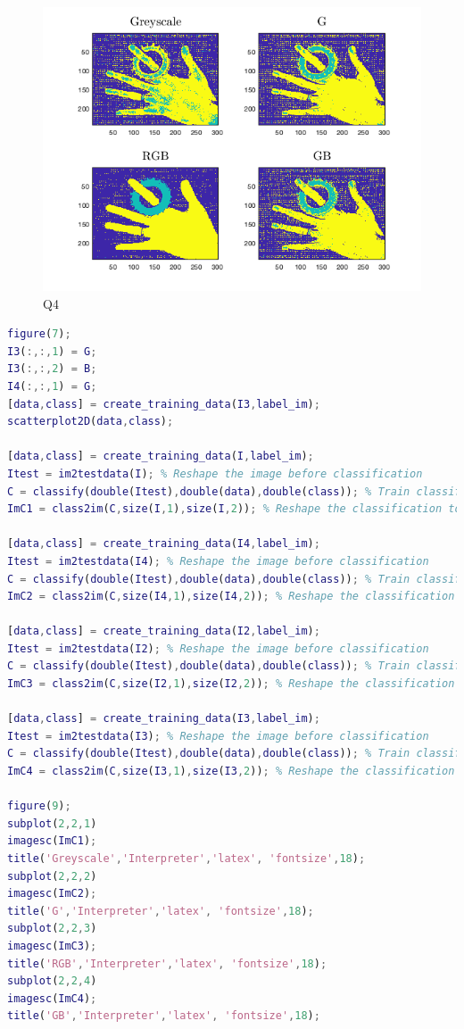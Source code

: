 \documentclass[oneside,a4paper]{article}
\begin{document}
\begin{figure}[ht!]
\centering
\includegraphics[width=130mm]{figures/Q4.png}
\caption{Q4}
\label{fig:Q4}
\end{figure}

\begin{lstlisting}[language=MATLAB]
figure(7);
I3(:,:,1) = G;
I3(:,:,2) = B;
I4(:,:,1) = G;
[data,class] = create_training_data(I3,label_im);
scatterplot2D(data,class);

[data,class] = create_training_data(I,label_im);
Itest = im2testdata(I); % Reshape the image before classification
C = classify(double(Itest),double(data),double(class)); % Train classifier and classify the data
ImC1 = class2im(C,size(I,1),size(I,2)); % Reshape the classification to an image

[data,class] = create_training_data(I4,label_im);
Itest = im2testdata(I4); % Reshape the image before classification
C = classify(double(Itest),double(data),double(class)); % Train classifier and classify the data
ImC2 = class2im(C,size(I4,1),size(I4,2)); % Reshape the classification to an image

[data,class] = create_training_data(I2,label_im);
Itest = im2testdata(I2); % Reshape the image before classification
C = classify(double(Itest),double(data),double(class)); % Train classifier and classify the data
ImC3 = class2im(C,size(I2,1),size(I2,2)); % Reshape the classification to an image

[data,class] = create_training_data(I3,label_im);
Itest = im2testdata(I3); % Reshape the image before classification
C = classify(double(Itest),double(data),double(class)); % Train classifier and classify the data
ImC4 = class2im(C,size(I3,1),size(I3,2)); % Reshape the classification to an image

figure(9);
subplot(2,2,1)
imagesc(ImC1);
title('Greyscale','Interpreter','latex', 'fontsize',18);
subplot(2,2,2)
imagesc(ImC2);
title('G','Interpreter','latex', 'fontsize',18);
subplot(2,2,3)
imagesc(ImC3); 
title('RGB','Interpreter','latex', 'fontsize',18);
subplot(2,2,4)
imagesc(ImC4); 
title('GB','Interpreter','latex', 'fontsize',18);
\end{lstlisting}
\end{document}
